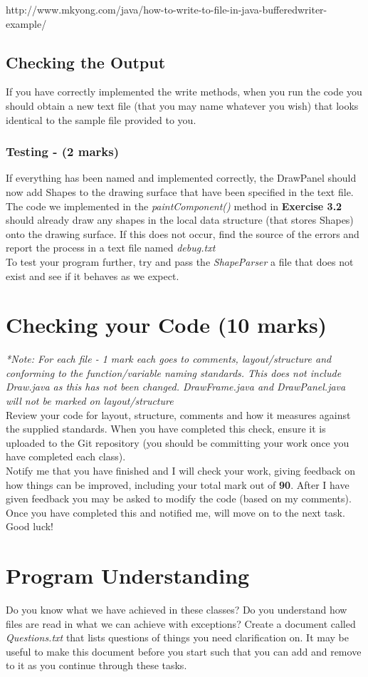 \documentclass[a4paper,12pt]{article}
\begin{document}
http://www.mkyong.com/java/how-to-write-to-file-in-java-bufferedwriter-example/

\subsection{Checking the Output}
If you have correctly implemented the write methods, when you run the code you should obtain a new text file (that you may name whatever you wish) that looks identical to the sample file provided to you.


\newpage
\subsubsection{Testing - (2 marks)}
If everything has been named and implemented correctly, the DrawPanel should now add Shapes to the drawing surface that have been specified in the text file. The code we implemented in the \textit{paintComponent()} method in {\bf Exercise 3.2} should already draw any shapes in the local data structure (that stores Shapes) onto the drawing surface. If this does not occur, find the source of the errors and report the process in a text file named \textit{debug.txt}\\

To test your program further, try and pass the \textit{ShapeParser} a file that does not exist and see if it behaves as we expect.


\newpage
\section{Checking your Code (10 marks)}
\textit{*Note: For each file - 1 mark each goes to comments, layout/structure and conforming to the function/variable naming standards. This does not include Draw.java as this has not been changed. DrawFrame.java and DrawPanel.java will not be marked on layout/structure}\\

Review your code for layout, structure, comments and how it measures against the supplied standards. When you have completed this check, ensure it is uploaded to the Git repository (you should be committing your work once you have completed each class).\\

Notify me that you have finished and I will check your work, giving feedback on how things can be improved, including your total mark out of {\bf 90}. After I have given feedback you may be asked to modify the code (based on my comments). Once you have completed this and notified me, will move on to the next task. Good luck!

\vspace{0.5cm}
\section{Program Understanding}
Do you know what we have achieved in these classes? Do you understand how files are read in what we can achieve with exceptions? Create a document called \textit{Questions.txt} that lists questions of things you need clarification on. It may be useful to make this document before you start such that you can add and remove to it as you continue through these tasks.
\end{document}
